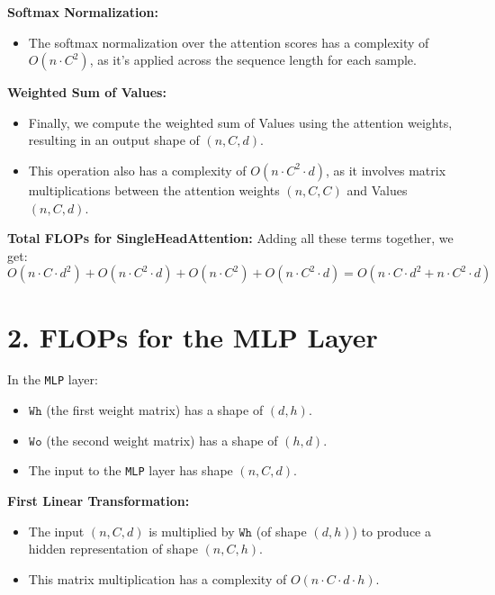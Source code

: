 \documentclass{article}
\begin{document}
\begin{tcolorbox}

\textbf{Softmax Normalization:}
\begin{itemize}
    \item The softmax normalization over the attention scores has a complexity of \(O(n \cdot C^2)\), as it’s applied across the sequence length for each sample.
\end{itemize}

\textbf{Weighted Sum of Values:}
\begin{itemize}
    \item Finally, we compute the weighted sum of Values using the attention weights, resulting in an output shape of \((n, C, d)\).
    \item This operation also has a complexity of \(O(n \cdot C^2 \cdot d)\), as it involves matrix multiplications between the attention weights \((n, C, C)\) and Values \((n, C, d)\).
\end{itemize}


\textbf{Total FLOPs for SingleHeadAttention:}
Adding all these terms together, we get:
\[
O(n \cdot C \cdot d^2) + O(n \cdot C^2 \cdot d) + O(n \cdot C^2) + O(n \cdot C^2 \cdot d) = O(n \cdot C \cdot d^2 + n \cdot C^2 \cdot d)
\]

\section*{2. FLOPs for the MLP Layer}

In the \texttt{MLP} layer:
\begin{itemize}
    \item \(\texttt{Wh}\) (the first weight matrix) has a shape of \((d, h)\).
    \item \(\texttt{Wo}\) (the second weight matrix) has a shape of \((h, d)\).
    \item The input to the \texttt{MLP} layer has shape \((n, C, d)\).
\end{itemize}

\textbf{First Linear Transformation:}
\begin{itemize}
    \item The input \((n, C, d)\) is multiplied by \(\texttt{Wh}\) (of shape \((d, h)\)) to produce a hidden representation of shape \((n, C, h)\).
    \item This matrix multiplication has a complexity of \(O(n \cdot C \cdot d \cdot h)\).
\end{itemize}


\end{tcolorbox}
\end{document}
